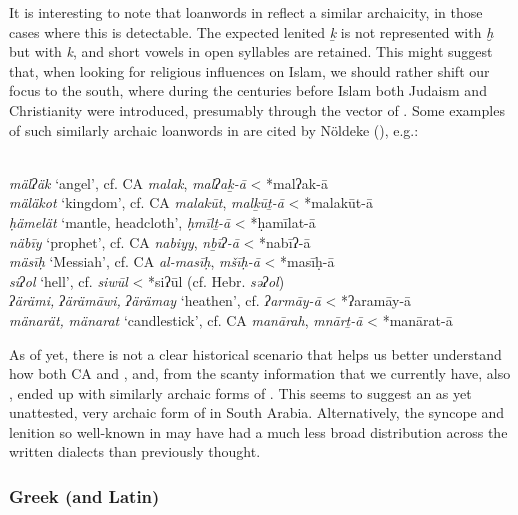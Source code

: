 \documentclass[output=paper]{langsci/langscibook}
\begin{document}
It is interesting to note that  {loanwords} in  reflect a similar archaicity, in those cases where this is detectable. The expected lenited \textit{ḵ} is not represented with  \textit{ḫ} but with \textit{k}, and short vowels in open syllables are retained. This might suggest that, when looking for religious influences on Islam, we should rather shift our focus to the south, where during the centuries before Islam both Judaism and Christianity were introduced, presumably through the vector of . Some examples of such similarly archaic  {loanwords} in  are cited by Nöldeke (\citeyear[31--46]{Nöldeke1910}), e.g.:

\ea {}\\
\ea \textit{mälʔäk} ‘angel’, cf. CA \textit{malak},  \textit{malʔaḵ-ā} < *malʔak-ā\\
\ex \textit{mäläkot} ‘kingdom’, cf. CA \textit{malakūt},  \textit{malḵūṯ-ā} < *malakūt-ā\\
\ex \textit{ḥämelät} ‘mantle, headcloth’,  \textit{ḥmīlṯ-ā} < *ḥamīlat-ā\\
\ex \textit{näbīy} ‘prophet’, cf. CA \textit{nabiyy},  \textit{nḇīʔ{}-ā} < *nabīʔ-ā\\
\ex \textit{mäsīḥ} ‘Messiah’, cf. CA \textit{al-masīḥ},  \textit{mšīḥ-ā} < *masīḥ-ā\\
\ex \textit{siʔol} ‘hell’, cf.  \textit{siwūl} < *siʔūl (cf. Hebr. \textit{səʔol})\\
\ex \textit{ʔärämi,} \textit{ʔärämāwi,} \textit{ʔärämay} ‘heathen’, cf.  \textit{ʔarmāy-ā} < *ʔaramāy-ā\\
\ex \textit{mänarät,} \textit{mänarat} ‘candlestick’, cf. CA \textit{manārah},  \textit{mnārṯ-ā} < *manārat-ā
\z
\z

As of yet, there is not a clear historical scenario that helps us better understand how both CA and , and, from the scanty information that we currently have, also , ended up with similarly archaic forms of . This seems to suggest an as yet unattested, very archaic form of  in South Arabia. Alternatively, the syncope and lenition so well-known in  may have had a much less broad distribution across the written  dialects than previously thought.

\subsubsection{\label{bkm:Ref13224479}Greek (and Latin)}
\end{document}

